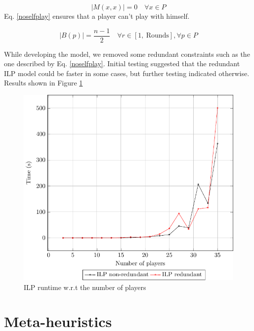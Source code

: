 \documentclass[a4paper, 10pt]{article}
\begin{document}
\begin{minipage}{0.45\linewidth}
\begin{equation}
    \label{noselfplay}
    |M(x,x)| = 0 \quad \forall x \in P 
\end{equation}
Eq. \ref{noselfplay} ensures that a player can't play with himself. 

\begin{equation}
    \label{blackfairness}
    |B(p)| = \frac{n-1}{2} \quad \forall r \in [1, \ \text{Rounds}], \forall p \in P
\end{equation}

    While developing the model, we removed some redundant constraints such as the one described by Eq. \ref{noselfplay}. Initial testing suggested that the redundant ILP model could be faster in some cases, but further testing indicated otherwise. Results shown in Figure \ref{figilp}
\end{minipage}
\begin{minipage}{0.49\linewidth}
\begin{figure}[H]
    \centering
    \includegraphics[width=\linewidth]{plots/time_per_instance.pdf}
    \caption{ILP runtime w.r.t the number of players}
    \label{figilp}
\end{figure}
\end{minipage}


\clearpage

\section{Meta-heuristics}
\end{document}
